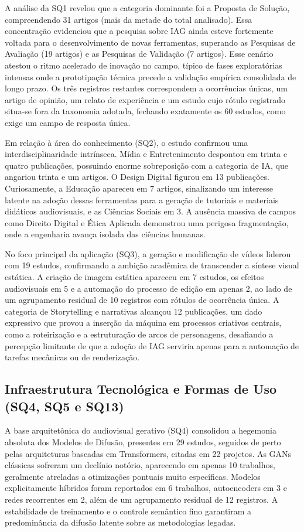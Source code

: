 A análise da SQ1 revelou que a categoria dominante foi a Proposta de Solução, compreendendo 31 artigos (mais da metade do total analisado). Essa concentração evidenciou que a pesquisa sobre IAG ainda esteve fortemente voltada para o desenvolvimento de novas ferramentas, superando as Pesquisas de Avaliação (19 artigos) e as Pesquisas de Validação (7 artigos). Esse cenário atestou o ritmo acelerado de inovação no campo, típico de fases exploratórias intensas onde a prototipação técnica precede a validação empírica consolidada de longo prazo. Os três registros restantes correspondem a ocorrências únicas, um artigo de opinião, um relato de experiência e um estudo cujo rótulo registrado situa-se fora da taxonomia adotada, fechando exatamente os 60 estudos, como exige um campo de resposta única.

Em relação à área do conhecimento (SQ2), o estudo confirmou uma interdisciplinaridade intrínseca. Mídia e Entretenimento despontou em trinta e quatro publicações, possuindo enorme sobreposição com a categoria de IA, que angariou trinta e um artigos. O Design Digital figurou em 13 publicações. Curiosamente, a Educação apareceu em 7 artigos, sinalizando um interesse latente na adoção dessas ferramentas para a geração de tutoriais e materiais didáticos audiovisuais, e as Ciências Sociais em 3. A ausência massiva de campos como Direito Digital e Ética Aplicada demonstrou uma perigosa fragmentação, onde a engenharia avança isolada das ciências humanas.

No foco principal da aplicação (SQ3), a geração e modificação de vídeos liderou com 19 estudos, confirmando a ambição acadêmica de transcender a síntese visual estática. A criação de imagem estática apareceu em 7 estudos, os efeitos audiovisuais em 5 e a automação do processo de edição em apenas 2, ao lado de um agrupamento residual de 10 registros com rótulos de ocorrência única. A categoria de Storytelling e narrativas alcançou 12 publicações, um dado expressivo que provou a inserção da máquina em processos criativos centrais, como a roteirização e a estruturação de arcos de personagens, desafiando a percepção limitante de que a adoção de IAG serviria apenas para a automação de tarefas mecânicas ou de renderização.

\subsection{Infraestrutura Tecnológica e Formas de Uso (SQ4, SQ5 e SQ13)}

A base arquitetônica do audiovisual gerativo (SQ4) consolidou a hegemonia absoluta dos Modelos de Difusão, presentes em 29 estudos, seguidos de perto pelas arquiteturas baseadas em Transformers, citadas em 22 projetos. As GANs clássicas sofreram um declínio notório, aparecendo em apenas 10 trabalhos, geralmente atreladas a otimizações pontuais muito específicas. Modelos explicitamente híbridos foram reportados em 6 trabalhos, autoencoders em 3 e redes recorrentes em 2, além de um agrupamento residual de 12 registros. A estabilidade de treinamento e o controle semântico fino garantiram a predominância da difusão latente sobre as metodologias legadas.

